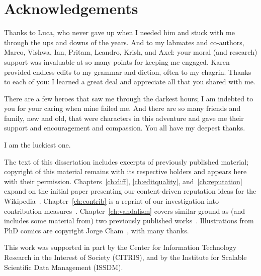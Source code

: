 \chapter{Acknowledgements}

Thanks to Luca, who never gave up when I needed him and stuck with
me through the ups and downs of the years.
And to my labmates and co-authors, Marco, Vishwa, Ian, Pritam, Leandro, Krish,
and Axel: your moral (and research) support
was invaluable at so many points for keeping me engaged.
Karen provided endless edits to my grammar and diction, often
to my chagrin.
Thanks to each of you: I learned a great deal and appreciate all that
you shared with me.

There are a few heroes that saw me through the darkest hours;
I am indebted to you for your caring when mine failed me.
And there are so many friends and family, new and old,
that were characters in this adventure and gave me their
support and encouragement and compassion.
You all have my deepest thanks.



\medskip

\begin{center}
I am the luckiest one.
\end{center}

\vfill

The text of this dissertation includes excerpts of
previously published material; copyright of this material
remains with its respective holders and appears here with their permission.
Chapters~\ref{ch:diff}, \ref{ch:editquality}, and~\ref{ch:reputation}
expand on the initial paper presenting our content-driven reputation
ideas for the Wikipedia~\cite{Adler2007}.
Chapter~\ref{ch:contrib} is a reprint of our investigation into
contribution measures~\cite{Adler2008a}.
Chapter~\ref{ch:vandalism} covers similar ground as (and includes
some material from) two previously
published works~\cite{Adler2010b,Adler2011a}.
Illustrations from PhD comics are copyright Jorge Cham~\cite{Cham2009},
with many thanks.


This work was supported in part by the Center for Information
Technology Research in the Interest of Society (CITRIS), and
by the Institute for Scalable Scientific Data Management (ISSDM).

